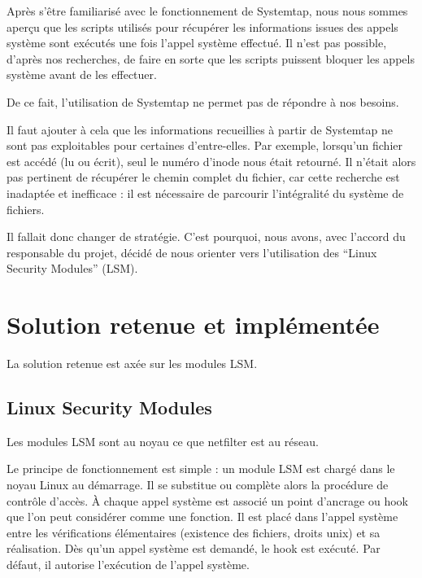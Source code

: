 \documentclass[pdftex,a4paper,titlepage,11pt]{article}
\begin{document}
Après s'être familiarisé avec le fonctionnement de Systemtap, nous nous sommes aperçu que les scripts utilisés pour récupérer les informations issues des appels système sont exécutés une fois l'appel système effectué. Il n'est pas possible, d'après nos recherches, de faire en sorte que les scripts puissent bloquer les appels système avant de les effectuer.

De ce fait, l'utilisation de Systemtap ne permet pas de répondre à nos besoins.

Il faut ajouter à cela que les informations recueillies à partir de Systemtap ne sont pas exploitables pour certaines d'entre-elles. Par exemple, lorsqu'un fichier est accédé (lu ou écrit), seul le numéro d'inode nous était retourné. Il n'était alors pas pertinent de récupérer le chemin complet du fichier, car cette recherche est inadaptée et inefficace : il est nécessaire de parcourir l'intégralité du système de fichiers.

Il fallait donc changer de stratégie. C'est pourquoi, nous avons, avec l'accord du responsable du projet, décidé de nous orienter vers l'utilisation des ``Linux Security Modules'' (LSM).


\section{Solution retenue et implémentée}

La solution retenue est axée sur les modules LSM.

\subsection{Linux Security Modules}

Les modules LSM sont au noyau ce que netfilter est au réseau.

Le principe de fonctionnement est simple : un module LSM est chargé dans le noyau Linux au démarrage. Il se substitue ou complète alors la procédure de contrôle d'accès. \`A chaque appel système est associé un point d'ancrage ou hook que l'on peut considérer comme une fonction. Il est placé dans l'appel système entre les vérifications élémentaires (existence des fichiers, droits unix) et sa réalisation. Dès qu'un appel système est demandé, le hook est exécuté. Par défaut, il autorise l'exécution de l'appel système.
\end{document}
